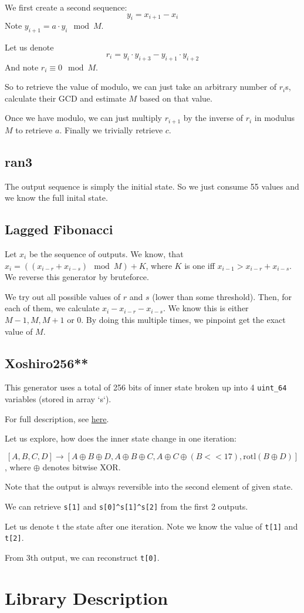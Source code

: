 \documentclass[12pt, a4paper]{report}
\begin{document}
We first create a second sequence:
$$y_{i} = x_{i+1} - x_{i}$$ Note $y_{i+1} = a \cdot y_{i} \mod M$.

Let us denote $$r_i = y_{i} \cdot y_{i+3} - y_{i+1} \cdot y_{i+2}$$
And note $r_i \equiv 0 \mod M$.

So to retrieve the value of modulo, we can just take an arbitrary number of $r_i$s, calculate their GCD and estimate $M$ based on that value.

Once we have modulo, we can just multiply $r_{i+1}$ by the inverse of $r_{i}$ in modulus $M$ to retrieve $a$. Finally we trivially retrieve $c$.

\section{ran3}
The output sequence is simply the initial state. So we just consume 55 values and we know the full inital state. 

\section{Lagged Fibonacci}
Let $x_i$ be the sequence of outputs. We know, that $x_{i} = ((x_{i-r} + x_{i-s}) \mod M) + K$, where $K$ is one iff $x_{i-1} > x_{i-r} + x_{i-s}$.
We reverse this generator by bruteforce.

We try out all possible values of $r$ and $s$ (lower than some threshold). Then, for each of them, we calculate $x_{i} - x_{i-r} - x_{i-s}$. We know this is either $M-1, M, M+1$ or $0$. By doing this multiple times, we pinpoint get the exact value of $M$.

\section{Xoshiro256**}
This generator uses a total of 256 bits of inner state broken up into 4 \verb|uint_64| variables (stored in array `s`).

For full description, see \href{https://en.m.wikipedia.org/wiki/Xorshift#xoshiro256**}{here}.

Let us explore, how does the inner state change in one iteration:

$$[A, B, C, D] \to [A\oplus B\oplus D, A\oplus B \oplus C, A\oplus C\oplus (B<<17), \text{rotl}(B\oplus D)]$$
, where $\oplus$ denotes bitwise XOR.

Note that the output is always reversible into the second element of given state.

We can retrieve \verb|s[1]| and \verb|s[0]^s[1]^s[2]| from the first 2 outputs.

Let us denote t the state after one iteration. Note we know the value of \verb|t[1]| and \verb|t[2]|.

From 3th output, we can reconstruct \verb|t[0]|.
\chapter{Library Description}
\end{document}
